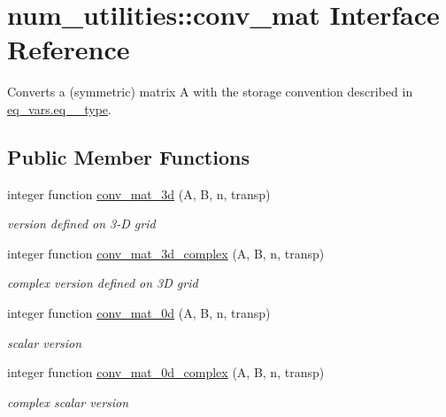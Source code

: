 \hypertarget{interfacenum__utilities_1_1conv__mat}{}\section{num\+\_\+utilities\+:\+:conv\+\_\+mat Interface Reference}
\label{interfacenum__utilities_1_1conv__mat}


Converts a (symmetric) matrix A with the storage convention described in \hyperlink{structeq__vars_1_1eq__2__type}{eq\+\_\+vars.\+eq\+\_\+\_\+type}.  


\subsection*{Public Member Functions}
\begin{DoxyCompactItemize}
\item 
integer function \hyperlink{interfacenum__utilities_1_1conv__mat_afb7b2860bd5b00e2c387b5d75148420a}{conv\+\_\+mat\+\_\+3d} (A, B, n, transp)
\begin{DoxyCompactList}\small\item\em version defined on 3-\/D grid \end{DoxyCompactList}\item 
integer function \hyperlink{interfacenum__utilities_1_1conv__mat_a1675a562dfca75f73d1a162e386f48d5}{conv\+\_\+mat\+\_\+3d\+\_\+complex} (A, B, n, transp)
\begin{DoxyCompactList}\small\item\em complex version defined on 3D grid \end{DoxyCompactList}\item 
integer function \hyperlink{interfacenum__utilities_1_1conv__mat_a1f24e4892c2253309edbdc6705869d47}{conv\+\_\+mat\+\_\+0d} (A, B, n, transp)
\begin{DoxyCompactList}\small\item\em scalar version \end{DoxyCompactList}\item 
integer function \hyperlink{interfacenum__utilities_1_1conv__mat_acaf526133b6c324e978a2e3601b11594}{conv\+\_\+mat\+\_\+0d\+\_\+complex} (A, B, n, transp)
\begin{DoxyCompactList}\small\item\em complex scalar version \end{DoxyCompactList}\end{DoxyCompactItemize}


